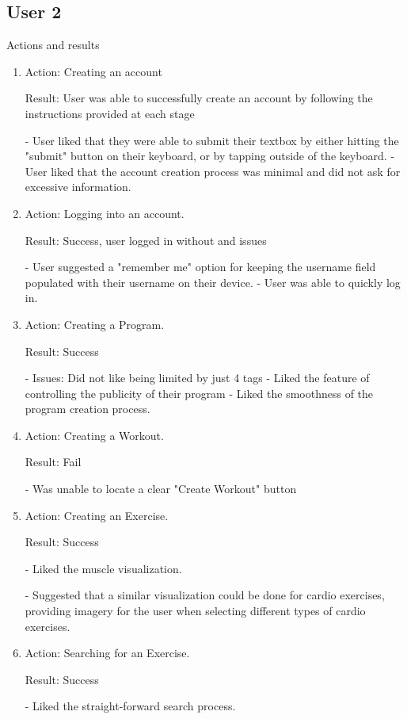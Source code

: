 \documentclass[12pt, titlepage]{article}
\begin{document}
\subsection{User 2}
Actions and results
\begin{enumerate}
	\item Action: Creating an account
	
	Result: User was able to successfully create an account by following the instructions provided at each stage
	
	-	User liked that they were able to submit their textbox by either hitting the "submit" button on their keyboard, or by tapping outside of the keyboard.
	-	User liked that the account creation process was minimal and did not ask for excessive information.
	
	\item Action: Logging into an account.
	
	Result: Success, user logged in without and issues
	
	-	User suggested a "remember me" option for keeping the username field populated with their username on their device.
	-	User was able to quickly log in.
	
	\item Action: Creating a Program.
	
	Result: Success 
	
	-	Issues: Did not like being limited by just 4 tags
	-	Liked the feature of controlling the publicity of their program
	-	Liked the smoothness of the program creation process.
	
	\item Action: Creating a Workout.
	
	Result: Fail
	
	-	Was unable to locate a clear "Create Workout" button
	
	\item Action: Creating an Exercise.
	
	Result: Success
	
	-	Liked the muscle visualization.
	
	- Suggested that a similar visualization could be done for cardio exercises, providing imagery for the user when selecting different types of cardio exercises.
	
	\item Action: Searching for an Exercise.
	
	Result: Success
	
	- Liked the straight-forward search process.
	

\end{enumerate}
\end{document}
